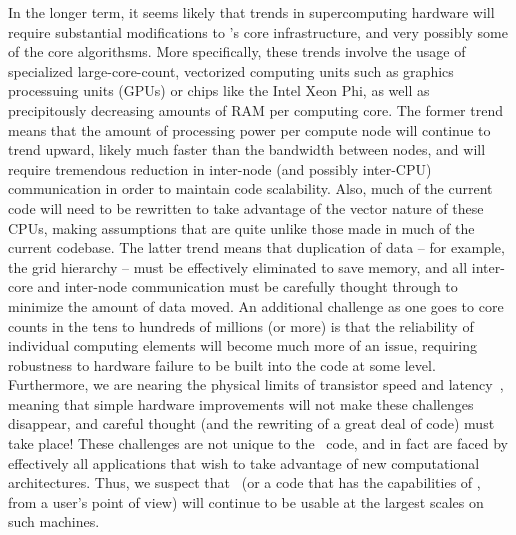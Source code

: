 In the longer term, it seems likely that trends in supercomputing
hardware will require substantial modifications to \enzo's core
infrastructure, and very possibly some of the core algorithsms.  More
specifically, these trends involve the usage of specialized
large-core-count, vectorized computing units such as graphics
processuing units (GPUs) or chips like the Intel Xeon Phi, as well as
precipitously decreasing amounts of RAM per computing core.  The
former trend means that the amount of processing power per compute
node will continue to trend upward, likely much faster than the
bandwidth between nodes, and will require tremendous reduction in
inter-node (and possibly inter-CPU) communication in order to maintain
code scalability.  Also, much of the current code will need to be
rewritten to take advantage of the vector nature of these CPUs, making
assumptions that are quite unlike those made in much of the current
codebase.  The latter trend means that duplication of data -- for
example, the grid hierarchy -- must be effectively eliminated to save
memory, and all inter-core and inter-node communication must be
carefully thought through to minimize the amount of data moved.  An
additional challenge as one goes to core counts in the tens to
hundreds of millions (or more) is that the reliability of individual
computing elements will become much more of an issue, requiring
robustness to hardware failure to be built into the code at some
level.  Furthermore, we are nearing the physical limits of transistor
speed and latency~\citep{feynman1999feynman}, meaning that simple
hardware improvements will not make these challenges disappear, and
careful thought (and the rewriting of a great deal of code) must take
place!  These challenges are not unique to the \enzo\ code, and in
fact are faced by effectively all applications that wish to take
advantage of new computational architectures.  Thus, we suspect that
\enzo\ (or a code that has the capabilities of \enzo, from a user's
point of view) will continue to be usable at the largest scales on
such machines.

